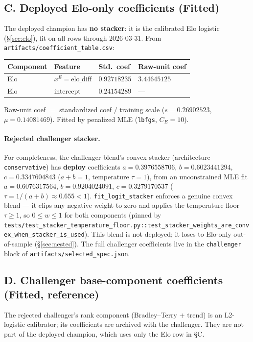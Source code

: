 \documentclass[10pt]{article}
\newcommand{\cls}[1]{\textbf{#1}}
\newcommand{\code}[1]{\texttt{#1}}
\begin{document}
\subsection{C. Deployed Elo-only coefficients (\cls{Fitted})}
\label{sec:stacker}

The deployed champion has \textbf{no stacker}: it is the calibrated Elo logistic
(\S\ref{sec:elo}), fit on all rows through 2026-03-31. From
\code{artifacts/coefficient\_table.csv}:

\begin{longtable}{@{}llll@{}}
\toprule
\textbf{Component} & \textbf{Feature} & \textbf{Std.\ coef} & \textbf{Raw-unit coef} \\
\midrule
\endhead
Elo & \(x^{E}=\mathrm{elo\_diff}\) & \(0.92718235\) & \(3.44645125\) \\
Elo & intercept & \(0.24154289\) & --- \\
\bottomrule
\end{longtable}
Raw-unit coef \(=\) standardized coef \(/\) training scale
(\(s=0.26902523\), \(\mu=0.14081469\)). Fitted by penalized MLE (\code{lbfgs},
\(C_E=10\)).

\paragraph{Rejected challenger stacker.}
For completeness, the challenger blend's convex stacker (architecture
\texttt{conservative}) has \textbf{deploy} coefficients
\(a=0.3976558706\), \(b=0.6023441294\), \(c=0.3347604843\)
(\(a+b=1\), temperature \(\tau=1\)), from an unconstrained MLE fit
\(a=0.6076317564\), \(b=0.9204024091\), \(c=0.3279170537\)
(\(\tau=1/(a+b)\approx 0.655<1\)). \code{fit\_logit\_stacker} enforces a genuine
convex blend --- it clips any negative weight to zero and applies the
temperature floor \(\tau\ge1\), so \(0\le w\le1\) for both components (pinned by
\code{tests/test\_stacker\_temperature\_floor.py::\allowbreak test\_stacker\_weights\_are\_convex\_when\_stacker\_is\_used}).
This blend is not deployed; it loses to Elo-only out-of-sample
(\S\ref{sec:nested}). The full challenger coefficients live in the
\code{challenger} block of \code{artifacts/selected\_spec.json}.

\subsection{D. Challenger base-component coefficients (\cls{Fitted}, reference)}

The rejected challenger's rank component (Bradley--Terry \(+\) trend) is an
L2-logistic calibrator; its coefficients are archived with the challenger. They
are not part of the deployed champion, which uses only the Elo row in \S C.
\end{document}
